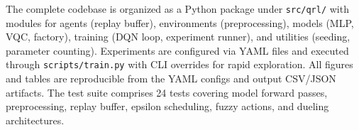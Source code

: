 The complete codebase is organized as a Python package under \texttt{src/qrl/}
with modules for agents (replay buffer), environments (preprocessing), models
(MLP, VQC, factory), training (DQN loop, experiment runner), and utilities
(seeding, parameter counting). Experiments are configured via YAML files and
executed through \texttt{scripts/train.py} with CLI overrides for rapid
exploration. All figures and tables are reproducible from the YAML configs and
output CSV/JSON artifacts. The test suite comprises 24 tests covering model
forward passes, preprocessing, replay buffer, epsilon scheduling, fuzzy actions,
and dueling architectures.
